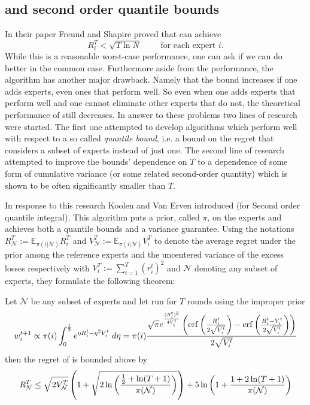 \subsection{\squint and second order quantile bounds}
\label{subsec:squint}
In their paper \cite{Freund1997} Freund and Shapire proved  that \hedge can achieve $$R^T_i < \sqrt{T \ln N}\qquad \text{ for each expert } i.$$ While this is a reasonable worst-case performance, one can ask if we can do better in the common case. Furthermore aside from the performance, the algorithm has another major drawback. Namely that the bound increases if one adds experts, even ones that perform well. So even when one adds experts that perform well and one cannot eliminate other experts that do not, the theoretical performance of \hedge still decreases. 
In answer to these problems two lines of research were started. The first one attempted to develop algorithms which perform well with respect to a so called \textit{quantile bound}, i.e. a bound on the regret that considers a subset of experts instead of just one. The second line of research attempted to improve the bounds' dependence on $T$ to a dependence of some form of cumulative variance (or some related second-order quantity) which is shown to be often significantly smaller than $T$. 

\par In response to this research Koolen and Van Erven introduced \squint\cite{Koolen2015} (for Second order quantile integral). This algorithm puts a prior, called $\pi$, on the experts and achieves both a quantile bounds and a variance guarantee. Using the notations $R^T_\mathcal{N} := \mathbb{E}_{\pi(i|\mathcal N)}R^T_i$ and  $V^T_\mathcal{N} := \mathbb{E}_{\pi(i|\mathcal N)}V^T_i$ to denote the average regret under the prior among the reference experts and the uncentered variance of the excess losses respectively with $V^T_i := \sum^T_{t=1}(r^t_i)^2$ and $\mathcal N$ denoting any subset of experts, they formulate the following theorem:

 \begin{theorem}\label{Thm:SquintPerf}\cite{Koolen2015}
 Let $\mathcal{N}$ be any subset of experts and let \squint run for $T$ rounds using the improper prior
  $$w^{t+1}_i \propto \pi(i)\int_0^{\frac12}e^{\eta R^t_i-\eta^2V_i^t} \;d\eta=\pi(i) \frac{\sqrt{\pi}e^{\frac{(R^t_i)^2}{4V^t_i}}\left(\operatorname{erf}\left(\frac{R^t_i}{2\sqrt{V_i^t}}\right)-\operatorname{erf}\left(\frac{R_i^t-V_i^t}{2\sqrt{V_i^t}}\right)\right)}{2\sqrt{V_i^t}}$$
  then the regret of \squint is bounded above by
  $$R^T_\mathcal{N}\leq \sqrt{2V^T_\mathcal N}\left(1+\sqrt{2\ln\left(\frac{\frac12+\ln(T+1)}{\pi(\mathcal{N})}\right)}\right)+5\ln\left(1+\frac{1+2\ln(T+1)}{\pi(\mathcal N)}\right)$$

 \end{theorem}

